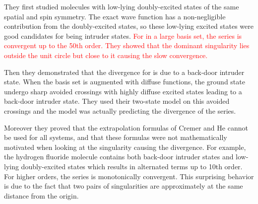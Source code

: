 \documentclass[aps,prb,reprint,noshowkeys,superscriptaddress]{revtex4-1}
\newcommand{\titou}[1]{\textcolor{red}{#1}}
\begin{document}
They first studied molecules with low-lying doubly-excited states of the same spatial and spin symmetry.
The exact wave function has a non-negligible contribution from the doubly-excited states, so these low-lying excited states were good candidates for being intruder states. \titou{For  in a large basis set, the series is convergent up to the 50th order. They showed that the dominant singularity lies outside the unit circle but close to it causing the slow convergence.}

Then they demonstrated that the divergence for  is due to a back-door intruder state. When the basis set is augmented with diffuse functions, the ground state undergo sharp avoided crossings with highly diffuse excited states leading to a back-door intruder state. They used their two-state model on this avoided crossings and the model was actually predicting the divergence of the series. 

Moreover they proved that the extrapolation formulas of Cremer and He \cite{Cremer_1996} cannot be used for all systems, and that these formulas were not mathematically motivated when looking at the singularity causing the divergence. 
For example, the hydrogen fluoride molecule contains both back-door intruder states and low-lying doubly-excited states which results in alternated terms up to 10th order. 
For higher orders, the series is monotonically convergent. This surprising behavior is due to the fact that two pairs of singularities are approximately at the same distance from the origin.
\end{document}
